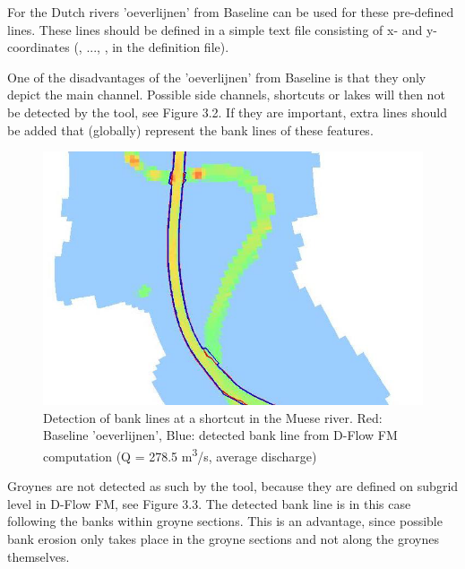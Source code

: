 For the Dutch rivers 'oeverlijnen' from Baseline can be used for these pre-defined lines.
These lines should be defined in a simple text file consisting of x- and y- coordinates (, ..., , in the definition file).

One of the disadvantages of the 'oeverlijnen' from Baseline is that they only depict the main channel.
Possible side channels, shortcuts or lakes will then not be detected by the tool, see Figure 3.2.
If they are important, extra lines should be added that (globally) represent the bank lines of these features.

\begin{figure}
\includegraphics[width=\textwidth]{figures/Fig3-2.png}
\caption{Detection of bank lines at a shortcut in the Muese river.
Red: Baseline 'oeverlijnen', Blue: detected bank line from D-Flow FM computation (Q = 278.5 m\textsuperscript{3}/s, average discharge)}
\label{Fig3.2}
\end{figure}

Groynes are not detected as such by the tool, because they are defined on subgrid level in D-Flow FM, see Figure 3.3.
The detected bank line is in this case following the banks within groyne sections.
This is an advantage, since possible bank erosion only takes place in the groyne sections and not along the groynes themselves.

